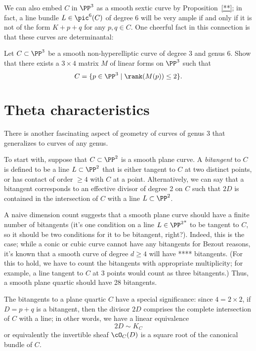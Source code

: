 We can also embed $C$ in $\PP^3$ as a smooth sextic curve by Proposition~\ref{**}; in fact, a line bundle $L \in \pic^6(C)$ of degree 6 will be very ample if and only if it is not of the form $K+p+q$ for any $p, q \in C$. One cheerful fact in this connection is that these curves are determinantal:

\begin{exercise}
Let $C \subset \PP^3$ be a smooth non-hyperelliptic curve of degree 3 and genus 6. Show that there exists a $3 \times 4$ matrix $M$ of linear forms on $\PP^3$ such that 
$$
C = \{ p \in \PP^3 \mid \rank(M(p)) \leq 2 \}.
$$
\end{exercise}

\section{Theta characteristics}

There is another fascinating aspect of geometry of curves of genus 3 that generalizes to curves of any genus.

To start with, suppose that $C \subset \PP^2$ is a smooth plane curve. A \emph{bitangent} to $C$ is defined to be a line $L \subset \PP^2$ that is either tangent to $C$ at two distinct points, or has contact of order $\geq 4$ with $C$ at a point. Alternatively, we can say that a bitangent  corresponds to an effective divisor of degree 2 on $C$ such that $2D$ is contained in the intersection of $C$ with a line $L \subset \PP^2$.

A naive dimension count suggests that a smooth plane curve should have a finite number of bitangents (it's one condition on a line $L \in {\PP^2}^*$ to be tangent to $C$, so it should be two conditions for it to be bitangent, right?). Indeed, this is the case; while a conic or cubic curve cannot have any bitangents for Bezout reasons, it's known that a smooth curve of degree $d \geq 4$ will have **** bitangents. (For this to hold, we have to count the bitangents with appropriate multiplicity; for example, a line tangent to $C$ at 3 points would count as three bitangents.) Thus, a smooth plane quartic should have 28 bitangents.

The bitangents to a plane quartic $C$ have a special significance: since $4 = 2 \times 2$, if $D = p+q$ is a bitangent, then the divisor $2D$ comprises the complete intersection of $C$ with a line; in other words, we have a linear equivalence
$$
2D \sim K_C
$$
or equivalently the invertible sheaf $\cO_C(D)$ is a square root of the canonical bundle of $C$.

